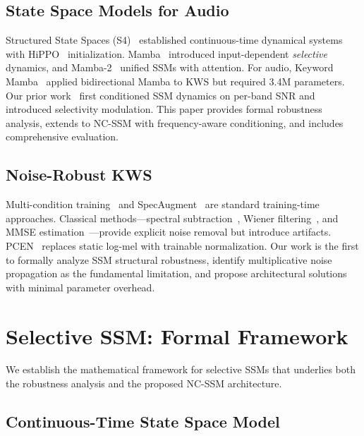 \documentclass[journal]{IEEEtran}
\begin{document}
\subsection{State Space Models for Audio}

Structured State Spaces (S4)~\cite{gu2022efficiently} established continuous-time dynamical systems with HiPPO~\cite{gu2020hippo} initialization.
Mamba~\cite{gu2024mamba} introduced input-dependent \emph{selective} dynamics, and Mamba-2~\cite{dao2024mamba2} unified SSMs with attention.
For audio, Keyword Mamba~\cite{goel2024keyword} applied bidirectional Mamba to KWS but required 3.4M parameters.
Our prior work~\cite{choi2026nanomamba_interspeech} first conditioned SSM dynamics on per-band SNR and introduced selectivity modulation.
This paper provides formal robustness analysis, extends to NC-SSM with frequency-aware conditioning, and includes comprehensive evaluation.

\subsection{Noise-Robust KWS}

Multi-condition training~\cite{ko2015audio} and SpecAugment~\cite{park2019specaugment} are standard training-time approaches.
Classical methods---spectral subtraction~\cite{boll1979suppression}, Wiener filtering~\cite{haykin2014adaptive}, and MMSE estimation~\cite{ephraim1984speech}---provide explicit noise removal but introduce artifacts.
PCEN~\cite{wang2017trainable} replaces static log-mel with trainable normalization.
Our work is the first to formally analyze SSM structural robustness, identify multiplicative noise propagation as the fundamental limitation, and propose architectural solutions with minimal parameter overhead.


\section{Selective SSM: Formal Framework}
\label{sec:background}

We establish the mathematical framework for selective SSMs that underlies both the robustness analysis and the proposed NC-SSM architecture.

\subsection{Continuous-Time State Space Model}
\end{document}
